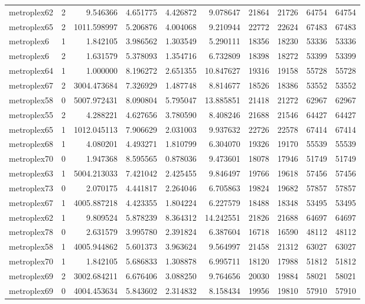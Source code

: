 \begin{longtable}{|l|r|r|r|r|r|r|r|r|r|}
metroplex62 & 2 & 9.546366 & 4.651775 & 4.426872 & 9.078647 & 21864 & 21726 & 64754 & 64754 \\
metroplex65 & 2 & 1011.598997 & 5.206876 & 4.004068 & 9.210944 & 22772 & 22624 & 67483 & 67483 \\
metroplex6 & 1 & 1.842105 & 3.986562 & 1.303549 & 5.290111 & 18356 & 18230 & 53336 & 53336 \\
metroplex6 & 2 & 1.631579 & 5.378093 & 1.354716 & 6.732809 & 18398 & 18272 & 53399 & 53399 \\
metroplex64 & 1 & 1.000000 & 8.196272 & 2.651355 & 10.847627 & 19316 & 19158 & 55728 & 55728 \\
metroplex67 & 2 & 3004.473684 & 7.326929 & 1.487748 & 8.814677 & 18526 & 18386 & 53552 & 53552 \\
metroplex58 & 0 & 5007.972431 & 8.090804 & 5.795047 & 13.885851 & 21418 & 21272 & 62967 & 62967 \\
metroplex55 & 2 & 4.288221 & 4.627656 & 3.780590 & 8.408246 & 21688 & 21546 & 64427 & 64427 \\
metroplex65 & 1 & 1012.045113 & 7.906629 & 2.031003 & 9.937632 & 22726 & 22578 & 67414 & 67414 \\
metroplex68 & 1 & 4.080201 & 4.493271 & 1.810799 & 6.304070 & 19326 & 19170 & 55539 & 55539 \\
metroplex70 & 0 & 1.947368 & 8.595565 & 0.878036 & 9.473601 & 18078 & 17946 & 51749 & 51749 \\
metroplex63 & 1 & 5004.213033 & 7.421042 & 2.425455 & 9.846497 & 19766 & 19618 & 57456 & 57456 \\
metroplex73 & 0 & 2.070175 & 4.441817 & 2.264046 & 6.705863 & 19824 & 19682 & 57857 & 57857 \\
metroplex67 & 1 & 4005.887218 & 4.423355 & 1.804224 & 6.227579 & 18488 & 18348 & 53495 & 53495 \\
metroplex62 & 1 & 9.809524 & 5.878239 & 8.364312 & 14.242551 & 21826 & 21688 & 64697 & 64697 \\
metroplex78 & 0 & 2.631579 & 3.995780 & 2.391824 & 6.387604 & 16718 & 16590 & 48112 & 48112 \\
metroplex58 & 1 & 4005.944862 & 5.601373 & 3.963624 & 9.564997 & 21458 & 21312 & 63027 & 63027 \\
metroplex70 & 1 & 1.842105 & 5.686833 & 1.308878 & 6.995711 & 18120 & 17988 & 51812 & 51812 \\
metroplex69 & 2 & 3002.684211 & 6.676406 & 3.088250 & 9.764656 & 20030 & 19884 & 58021 & 58021 \\
metroplex69 & 0 & 4004.453634 & 5.843602 & 2.314832 & 8.158434 & 19956 & 19810 & 57910 & 57910 \\

\end{longtable}
